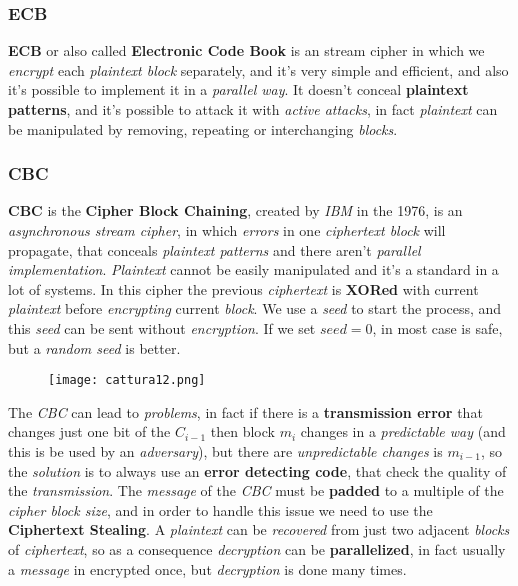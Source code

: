 \documentclass{article}
\begin{document}
\subsubsection{ECB}
\textbf{ECB} or also called \textbf{Electronic Code Book} is an stream cipher in which we \emph{encrypt} each \emph{plaintext block} separately, and it's very simple and efficient, and also it's possible to implement it in a \emph{parallel way}. It doesn't conceal \textbf{plaintext patterns}, and it's possible to attack it with \emph{active attacks}, in fact \emph{plaintext} can be manipulated by removing, repeating or interchanging \emph{blocks}. 
\subsubsection{CBC}
\textbf{CBC} is the \textbf{Cipher Block Chaining}, created by \emph{IBM} in the 1976, is an \emph{asynchronous stream cipher}, in which \emph{errors} in one \emph{ciphertext block} will propagate, that conceals \emph{plaintext patterns} and there aren't \emph{parallel implementation}. \emph{Plaintext} cannot be easily manipulated and it's a standard in a lot of systems. In this cipher the previous \emph{ciphertext} is \textbf{XORed} with current \emph{plaintext} before \emph{encrypting} current \emph{block}. We use a \emph{seed} to start the process, and this \emph{seed} can be sent without \emph{encryption}. If we set $seed=0$, in most case is safe, but a \emph{random seed} is better.
\begin{figure}[H]
  \centering
  \texttt{[image: cattura12.png]}
\end{figure}
The \emph{CBC} can lead to \emph{problems}, in fact if there is a \textbf{transmission error} that changes just one bit of the $C_{i-1}$ then block $m_i$ changes in a \emph{predictable way} (and this is be used by an \emph{adversary}), but there are \emph{unpredictable changes} is $m_{i-1}$, so the \emph{solution} is to always use an \textbf{error detecting code}, that check the quality of the \emph{transmission}. The \emph{message} of the \emph{CBC} must be \textbf{padded} to a multiple of the \emph{cipher block size}, and in order to handle this issue we need to use the \textbf{Ciphertext Stealing}. A \emph{plaintext} can be \emph{recovered} from just two adjacent \emph{blocks} of \emph{ciphertext}, so as a consequence \emph{decryption} can be \textbf{parallelized}, in fact usually a \emph{message} in encrypted once, but \emph{decryption} is done many times. \\\\
\end{document}
